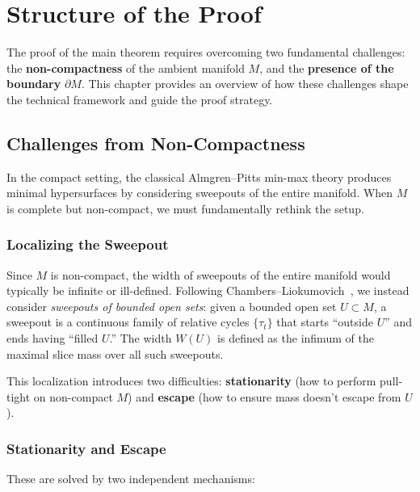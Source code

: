 \chapter{Structure of the Proof}\label{ch:structure}

The proof of the main theorem requires overcoming two fundamental challenges: the \textbf{non-compactness} of the ambient manifold $M$, and the \textbf{presence of the boundary} $\partial M$. This chapter provides an overview of how these challenges shape the technical framework and guide the proof strategy.

\section{Challenges from Non-Compactness}\label{sec:challenges-noncompact}

In the compact setting, the classical Almgren--Pitts min-max theory produces minimal hypersurfaces by considering sweepouts of the entire manifold. When $M$ is complete but non-compact, we must fundamentally rethink the setup.

\subsection*{Localizing the Sweepout}

Since $M$ is non-compact, the width of sweepouts of the entire manifold would typically be infinite or ill-defined. Following Chambers--Liokumovich~\cite{CL20}, we instead consider \emph{sweepouts of bounded open sets}: given a bounded open set $U \subset M$, a sweepout is a continuous family of relative cycles $\{\tau_t\}$ that starts ``outside $U$'' and ends having ``filled $U$.'' The width $W(U)$ is defined as the infimum of the maximal slice mass over all such sweepouts.

This localization introduces two difficulties: \textbf{stationarity} (how to perform pull-tight on non-compact $M$) and \textbf{escape} (how to ensure mass doesn't escape from $U$).

\subsection*{Stationarity and Escape}

These are solved by two independent mechanisms:

